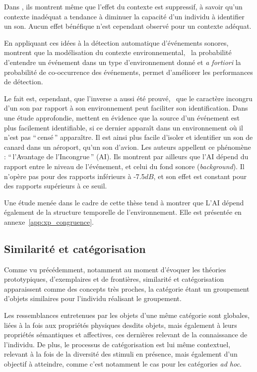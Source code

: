 {Dans \citep{ballas1991effects}, ils montrent même que l'effet du contexte est suppressif, à savoir qu'un contexte inadéquat a tendance à diminuer la capacité d'un individu à identifier un son. Aucun effet bénéfique n'est cependant observé pour un contexte adéquat.

En appliquant ces idées à la détection automatique d'événements sonores, \citep{niessen2008disambiguating} montrent que la modélisation du contexte environnemental, \ie~la probabilité d'entendre un événement dans un type d'environnement donné et \emph{a fortiori} la probabilité de co-occurrence des événements, permet d'améliorer les performances de détection. 

Le fait est, cependant, que l'inverse a aussi été prouvé, \ie~que le caractère incongru d'un son par rapport à son environnement peut faciliter son identification. Dans une étude approfondie, \citep{gygi2011incongruency} mettent en évidence que la source d'un événement est plus facilement identifiable, si ce dernier apparaît dans un environnement où il n'est pas ``\,censé\,'' apparaître. Il est ainsi plus facile d'isoler et identifier un son de canard dans un aéroport, qu'un son d'avion. Les auteurs appellent ce phénomène : ``\,l'Avantage de l'Incongrue\,'' (AI). Ils montrent par ailleurs que l'AI dépend du rapport entre le niveau de l'événement, et celui du fond sonore (\emph{background}). Il n'opère pas pour des rapports inférieurs à -7.5$dB$, et son effet est constant pour des rapports supérieurs à ce seuil.

Une étude menée dans le cadre de cette thèse tend à montrer que L'AI dépend également de la structure temporelle de l'environnement. Elle est présentée en annexe~\ref{app:xp_congruence}. \\


\subsection{Similarité et catégorisation}

Comme vu précédemment, notamment au moment d'évoquer les théories prototypiques, d'exemplaires et de frontières, similarité et catégorisation apparaissent comme des concepts très proches, la catégorie étant un groupement d'objets similaires pour l'individu réalisant le groupement.

Les ressemblances entretenues par les objets d'une même catégorie sont globales, liées à la fois aux propriétés physiques desdits objets, mais également à leurs propriétés sémantiques et affectives, ces dernières relevant de la connaissance de l'individu. De plus, le processus de catégorisation est lui même contextuel, relevant à la fois de la diversité des stimuli en présence, mais également d'un objectif à atteindre, comme c'est notamment le cas pour les catégories \emph{ad hoc}.

}
